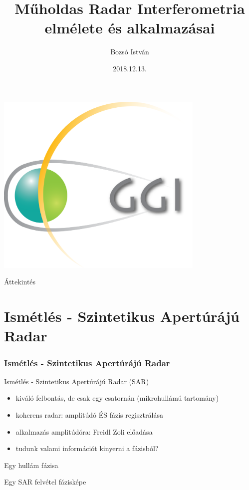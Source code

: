 \documentclass[aspectratio=169]{beamer}
\title[Műholdas Távérzékelés Labor, 2018/19.I.]{Műholdas Radar Interferometria elmélete és alkalmazásai}
\author[Bozsó István]{Bozsó István}
\institute[MTA CSFK GGI]{MTA CSFK Geodéziai és Geofizikai Intézet}
\date{2018.12.13.}
\begin{document}
\begin{frame}
    \titlepage
    \begin{center}
        \begin{minipage}[c]{0.3\textwidth}
            \includegraphics[width=0.75\textwidth]{ggi_logo.png}
        \end{minipage}
    \end{center}
\end{frame}

\begin{frame}{Áttekintés}
    \tableofcontents
\end{frame}


\section{Ismétlés - Szintetikus Apertúrájú Radar}
\frametitle{Ismétlés - Szintetikus Apertúrájú Radar}

\begin{frame}{Ismétlés - Szintetikus Apertúrájú Radar (SAR)}
    \begin{itemize}
        \item kiváló felbontás, de csak egy csatornán (mikrohullámú tartomány)
        \item koherens radar: amplitúdó ÉS fázis regisztrálása
        \item alkalmazás amplitúdóra: Freidl Zoli előadása
        \item tudunk valami információt kinyerni a fázisból?
    \end{itemize}
\end{frame}




\begin{frame}{Egy hullám fázisa}
    
\end{frame}


\begin{frame}{Egy SAR felvétel fázisképe}
    \begin{minic}{0.5}
    \end{minic}
\end{frame}
\end{document}
